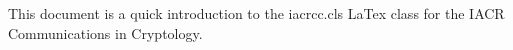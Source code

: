 \begin{textabstract}
  This document is a quick introduction to the iacrcc.cls
  LaTex class for the IACR Communications in Cryptology.
\end{textabstract}





%

% 




%  












%

%


\appendix 



\eprint{}{}
%



\endinput
